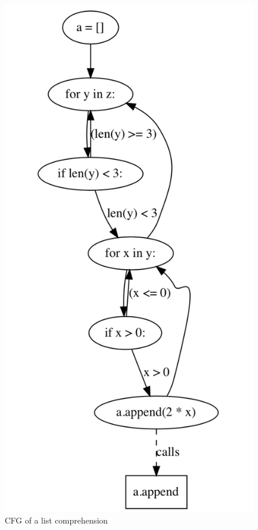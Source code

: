 \documentclass[11pt]{article}
\begin{document}
\begin{figure}[H]
\begin{minipage}{.43\linewidth}
    \includegraphics[width=\linewidth]{listcomp}
    \caption{CFG of a list comprehension}
    \label{listcomp}
\end{minipage}
\end{figure}
\end{document}
